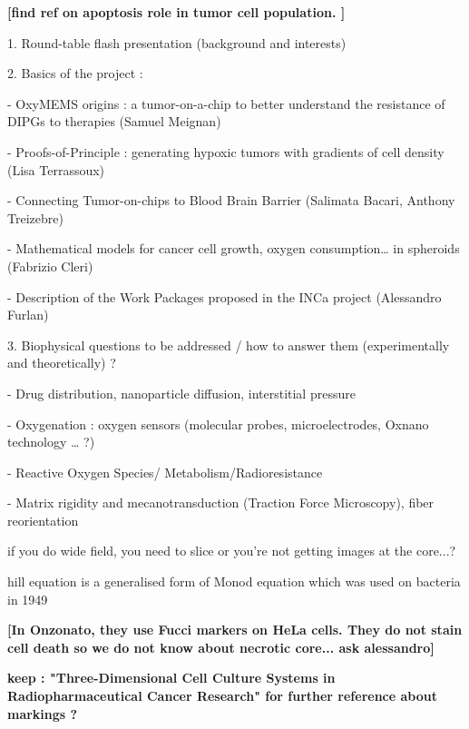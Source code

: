 \documentclass[11pt,a4paper]{article}
\begin{document}

\textbf{[find ref on apoptosis role in tumor cell population. ]}





1.      Round-table flash presentation (background and interests)

2.      Basics of the project :

-        OxyMEMS origins : a tumor-on-a-chip to better understand the resistance of DIPGs to therapies (Samuel Meignan) 

-        Proofs-of-Principle : generating hypoxic tumors with gradients of cell density (Lisa Terrassoux) 

-        Connecting Tumor-on-chips to Blood Brain Barrier (Salimata Bacari, Anthony Treizebre)

-        Mathematical models for cancer cell growth, oxygen consumption… in spheroids (Fabrizio Cleri) 

-        Description of the Work Packages proposed in the INCa project (Alessandro Furlan)

3.      Biophysical questions to be addressed / how to answer them (experimentally and theoretically) ?

-        Drug distribution, nanoparticle diffusion, interstitial pressure

-        Oxygenation : oxygen sensors (molecular probes, microelectrodes, Oxnano technology … ?)

-        Reactive Oxygen Species/ Metabolism/Radioresistance

-        Matrix rigidity and mecanotransduction (Traction Force Microscopy), fiber reorientation

if you do wide field, you need to slice or you're not getting images at the core...?

hill equation is a  generalised form of Monod equation which was used on bacteria in 1949

\textbf{[In Onzonato, they use Fucci markers on HeLa cells. They do not stain cell death so we do not know about necrotic core... ask alessandro]}

\textbf{keep : "Three-Dimensional Cell Culture Systems in Radiopharmaceutical Cancer Research" for further reference about markings ?}
\end{document}
